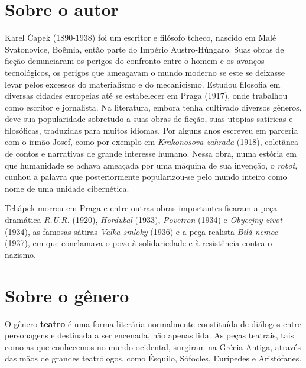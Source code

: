 \documentclass[11pt]{extarticle}
\begin{document}


\section{Sobre o autor}

Karel Čapek (1890-1938) foi um escritor e filósofo tcheco, nascido em Malé Svatonovice, Boêmia, então parte do Império Austro-Húngaro. Suas obras de ficção denunciaram os perigos do confronto entre o homem e os avanços tecnológicos, os perigos que ameaçavam o mundo moderno se este se deixasse levar pelos excessos do materialismo e do mecanicismo. Estudou filosofia em diversas cidades europeias até se estabelecer em Praga (1917), onde trabalhou como escritor e jornalista. Na literatura, embora tenha cultivado diversos gêneros, deve sua popularidade sobretudo a suas obras de ficção, suas utopias satíricas e filosóficas, traduzidas para muitos idiomas. Por alguns anos escreveu em parceria com o irmão Josef, como por exemplo em \textit{Krakonosova zahrada} (1918), coletânea de contos e narrativas de grande interesse humano. Nessa obra, numa estória em que humanidade se achava ameaçada por uma máquina de sua invenção, o \textit{robot}, cunhou a palavra que posteriormente popularizou-se pelo mundo inteiro como nome de uma unidade cibernética. 

Tchápek morreu em Praga e entre outras obras importantes ficaram a peça dramática \textit{R.U.R.} (1920), \textit{Hordubal} (1933), \textit{Povetron} (1934) e \textit{Obycejny zivot} (1934), as famosas sátiras \textit{Valka smloky} (1936) e a peça realista \textit{Bilá nemoc} (1937), em que conclamava o povo à solidariedade e à resistência contra o nazismo.


\section{Sobre o gênero}

O gênero \textbf{teatro} é uma forma literária normalmente constituída de diálogos entre personagens e destinada a ser encenada, não apenas lida. As peças teatrais, tais como as que conhecemos no mundo ocidental, surgiram na Grécia Antiga, através das mãos de grandes teatrólogos, como Ésquilo, Sófocles, Eurípedes e Aristófanes.
\end{document}
